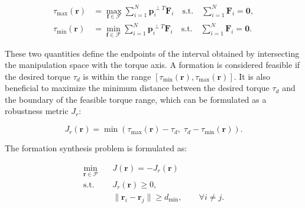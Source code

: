 \begin{equation}
\begin{aligned}
\tau_{\max}(\mathbf{r})
&=
\max_{\mathbf{f}\in\mathcal{F}}
\sum_{i=1}^{N}
\mathbf{p}_i^{\perp T}\mathbf{F}_i
\quad
\text{s.t.}\quad
\sum_{i=1}^{N}\mathbf{F}_i=\mathbf{0},
\\
\tau_{\min}(\mathbf{r})
&=
\min_{\mathbf{f}\in\mathcal{F}}
\sum_{i=1}^{N}
\mathbf{p}_i^{\perp T}\mathbf{F}_i
\quad
\text{s.t.}\quad
\sum_{i=1}^{N}\mathbf{F}_i=\mathbf{0}.
\end{aligned}
\end{equation}

These two quantities define the endpoints of the interval obtained by intersecting the manipulation space with the torque axis. A formation is considered feasible if the desired torque $\tau_d$ is within the range $[\tau_{\min}(\mathbf{r}),\tau_{\max}(\mathbf{r})]$. It is also beneficial to maximize the minimum distance between the desired torque $\tau_d$ and the boundary of the feasible torque range, which can be formulated as a robustness metric $J_r$:

\begin{equation}
J_r(\mathbf{r}) =
\min\left(
\tau_{\max}(\mathbf{r})-\tau_d,\;
\tau_d-\tau_{\min}(\mathbf{r})
\right).
\end{equation}

The formation synthesis problem is formulated as:

\begin{subequations}
\begin{align}
\min_{\mathbf{r}\in\mathcal{P}}
\quad & J(\mathbf{r}) = -J_r(\mathbf{r})
\label{eq:objective1} \\[2mm]
\text{s.t.}\quad
& J_r(\mathbf{r}) \geq 0,
\label{eq:wrench_constraint} \\[2mm]
& \|\mathbf{r}_i-\mathbf{r}_j\| \geq d_{\min},
\qquad \forall i \neq j .
\label{eq:distance_constraint}
\end{align}
\label{eq:formation_synthesis}
\end{subequations}

